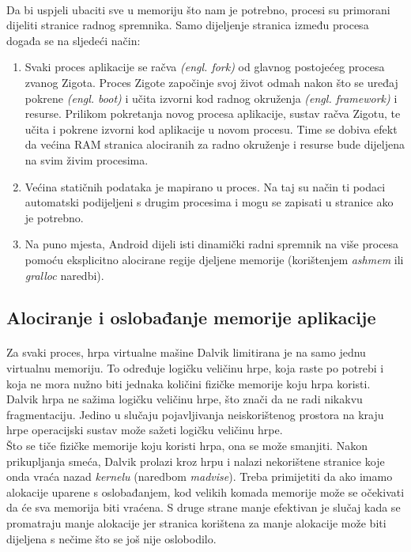 \documentclass[times, utf8, zavrsni]{fer}
\begin{document}
\paragraph{}
Da bi uspjeli ubaciti sve u memoriju što nam je potrebno, procesi su primorani dijeliti stranice radnog spremnika. Samo dijeljenje stranica između procesa događa se na sljedeći način:

\begin{enumerate}
\item
Svaki proces aplikacije se račva \textit{(engl. fork)} od glavnog postojećeg procesa zvanog Zigota. Proces Zigote započinje svoj život odmah nakon što se uređaj pokrene \textit{(engl. boot)} i učita izvorni kod radnog okruženja \textit{(engl. framework)} i resurse. Prilikom pokretanja novog procesa aplikacije, sustav račva Zigotu, te učita i pokrene izvorni kod aplikacije u novom procesu. Time se dobiva efekt da većina RAM stranica alociranih za radno okruženje i resurse bude dijeljena na svim živim procesima.

\item
Većina statičnih podataka je mapirano u proces. Na taj su način ti podaci automatski podijeljeni s drugim procesima i mogu se zapisati u stranice ako je potrebno.

\item
Na puno mjesta, Android dijeli isti dinamički radni spremnik na više procesa pomoću eksplicitno alocirane regije djeljene memorije (korištenjem \textit{ashmem} ili \textit{gralloc} naredbi).
\end{enumerate}

\subsection{Alociranje i oslobađanje memorije aplikacije}
\paragraph{}
Za svaki proces, hrpa virtualne mašine Dalvik limitirana je na samo jednu virtualnu memoriju. To određuje logičku veličinu hrpe, koja raste po potrebi i koja ne mora nužno biti jednaka količini fizičke memorije koju hrpa koristi. Dalvik hrpa ne sažima logičku veličinu hrpe, što znači da ne radi nikakvu fragmentaciju. Jedino u slučaju pojavljivanja neiskorištenog prostora na kraju hrpe operacijski sustav može sažeti logičku veličinu hrpe.\\

Što se tiče fizičke memorije koju koristi hrpa, ona se može smanjiti. Nakon prikupljanja smeća, Dalvik prolazi kroz hrpu i nalazi nekorištene stranice koje onda vraća nazad \textit{kernelu} (naredbom \textit{madvise}). Treba primijetiti da ako imamo alokacije uparene s oslobađanjem, kod velikih komada memorije može se očekivati da će sva memorija biti vraćena. S druge strane manje efektivan je slučaj kada se promatraju manje alokacije jer stranica korištena za manje alokacije može biti dijeljena s nečime što se još nije oslobodilo.
\end{document}
